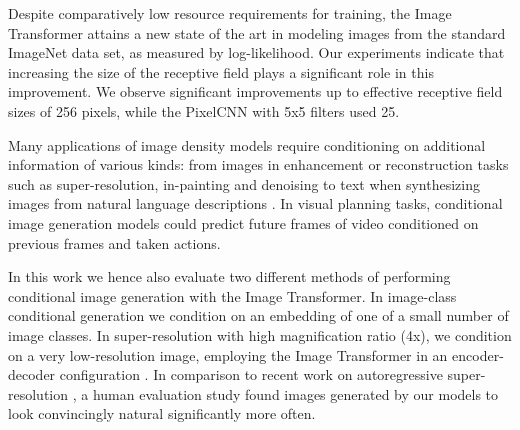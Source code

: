 Despite comparatively low resource requirements for training, the Image Transformer attains a new state of the art in modeling images from the standard ImageNet data set, as measured by log-likelihood. Our experiments indicate that increasing the size of the receptive field plays a significant role in this improvement. We observe significant improvements up to effective receptive field sizes of 256 pixels, while the PixelCNN \cite{PixelCNN} with 5x5 filters used 25.

Many applications of image density models require conditioning on additional information of various kinds: from images in enhancement or reconstruction tasks such as super-resolution, in-painting and denoising to text when synthesizing images from natural language descriptions \cite{Mansimov15}. In visual planning tasks, conditional image generation models could predict future frames of video conditioned on previous frames and taken actions.

In this work we hence also evaluate two different methods of performing conditional image generation with the Image Transformer. In image-class conditional generation we condition on an embedding of one of a small number of image classes. In super-resolution with high magnification ratio (4x), we condition on a very low-resolution image, employing the Image Transformer in an encoder-decoder configuration \cite{KalchbrennerB13}. In comparison to recent work on autoregressive super-resolution \cite{PixelRecursiveSuperResolution}, a human evaluation study found images generated by our models to look convincingly natural significantly more often.




